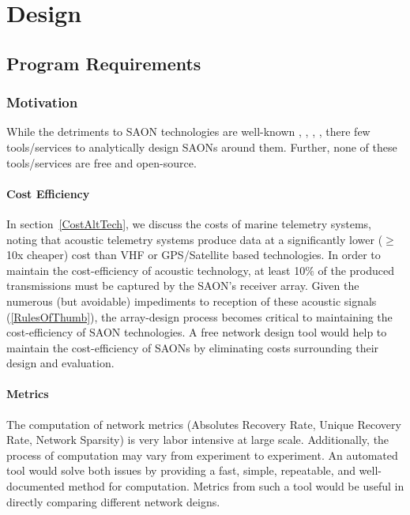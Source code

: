 \chapter{Design}
\label{design}
\section{Program Requirements}
\label{programRequirements}

\subsection{Motivation}
While the detriments to SAON technologies are well-known \cite{Akbarzadeh2013}, \cite{Heupel2006}, \cite{Howard2002},  \cite{Kessel2015}, \cite{Steel2014} there few tools/services to analytically design SAONs around them.  Further, none of these tools/services are free and open-source.


\subsubsection{Cost Efficiency}
\label{motivationCost}
In section~\ref{CostAltTech}, we discuss the costs of marine telemetry systems, noting that acoustic telemetry systems produce data at a significantly lower ($\ge$10x cheaper) cost than VHF or GPS/Satellite based technologies.  In order to maintain the cost-efficiency of acoustic technology, at least 10$\%$ of the produced transmissions must be captured by the SAON's receiver array.  Given the numerous (but avoidable) impediments to reception of these acoustic signals (\ref{RulesOfThumb}), the array-design process becomes critical to maintaining the cost-efficiency of SAON technologies.  A free network design tool would help to maintain the cost-efficiency of SAONs by eliminating costs surrounding their design and evaluation.  


\subsubsection{Metrics}
\label{motivationMetrics}
The computation of network metrics (Absolutes Recovery Rate, Unique Recovery Rate, Network Sparsity) is very labor intensive at large scale.  Additionally, the process of computation may vary from experiment to experiment.  An automated tool would solve both issues by providing a fast, simple, repeatable, and well-documented method for computation.  Metrics from such a tool would be useful in directly comparing different network deigns.


